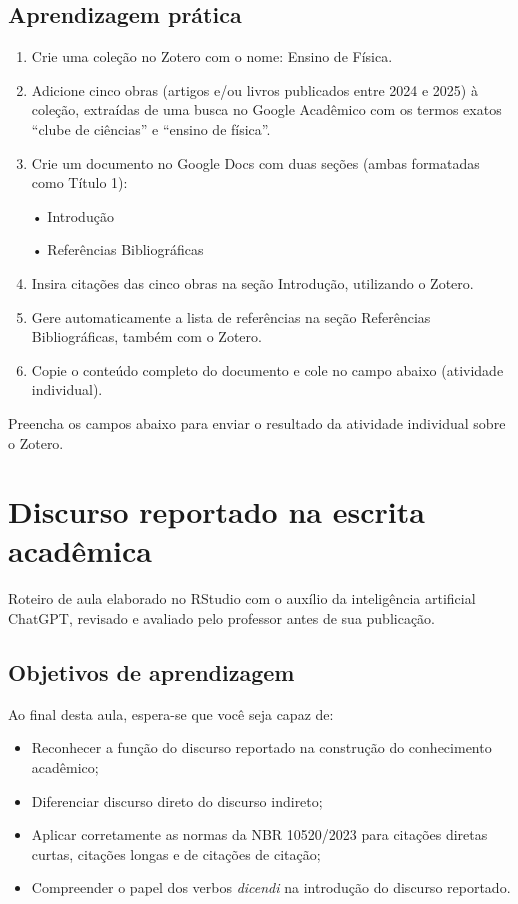 \documentclass[
  letterpaper,
  DIV=11,
  numbers=noendperiod]{scrreprt}
\providecommand{\tightlist}{%
  \setlength{\itemsep}{0pt}\setlength{\parskip}{0pt}}
\begin{document}
\section{Aprendizagem prática}\label{aprendizagem-pruxe1tica-4}

\begin{enumerate}
\def\labelenumi{\arabic{enumi}.}
\item
  Crie uma coleção no Zotero com o nome: Ensino de Física.
\item
  Adicione cinco obras (artigos e/ou livros publicados entre 2024 e
  2025) à coleção, extraídas de uma busca no Google Acadêmico com os
  termos exatos ``clube de ciências'' e ``ensino de física''.
\item
  Crie um documento no Google Docs com duas seções (ambas formatadas
  como Título 1):

  • Introdução

  • Referências Bibliográficas
\item
  Insira citações das cinco obras na seção Introdução, utilizando o
  Zotero.
\item
  Gere automaticamente a lista de referências na seção Referências
  Bibliográficas, também com o Zotero.
\item
  Copie o conteúdo completo do documento e cole no campo abaixo
  (atividade individual).
\end{enumerate}

Preencha os campos abaixo para enviar o resultado da atividade
individual sobre o Zotero.

\chapter{Discurso reportado na escrita
acadêmica}\label{discurso-reportado-na-escrita-acaduxeamica}

Roteiro de aula elaborado no RStudio com o auxílio da inteligência
artificial ChatGPT, revisado e avaliado pelo professor antes de sua
publicação.

\section{Objetivos de aprendizagem}\label{objetivos-de-aprendizagem-4}

Ao final desta aula, espera-se que você seja capaz de:

\begin{itemize}
\tightlist
\item
  Reconhecer a função do discurso reportado na construção do
  conhecimento acadêmico;
\item
  Diferenciar discurso direto do discurso indireto;
\item
  Aplicar corretamente as normas da NBR 10520/2023 para citações diretas
  curtas, citações longas e de citações de citação;
\item
  Compreender o papel dos verbos \emph{dicendi} na introdução do
  discurso reportado.
\end{itemize}
\end{document}
